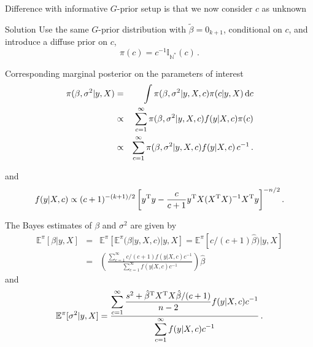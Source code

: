 \begin{slide}

Difference with informative $G$-prior setup is that we now
consider $c$ as unknown 

\pause\vs \begin{block}{Solution} 
Use the same $G$-prior distribution with $\tilde\beta=0_{k+1}$, 
conditional on $c$, and introduce a diffuse prior on $c$, 
$$
\pi(c) = c^{-1}\mathbb{I}_{\mathbb{N}^*}(c) \,.
$$
\end{block}

\end{slide}\begin{slide}

Corresponding marginal posterior on the parameters of interest 
\small
\begin{eqnarray*}
\pi(\beta,\sigma^2|y,X) &=& \int \pi(\beta,\sigma^2|y,X,c)\pi(c|y,X)\,\hbox{d}c \\
&\propto& \sum_{c=1}^\infty \pi(\beta,\sigma^2|y,X,c)f(y|X,c)\pi(c) \\
&\propto& \sum_{c=1}^\infty \pi(\beta,\sigma^2|y,X,c)f(y|X,c)\,c^{-1}\,.
\end{eqnarray*}
\normalsize

\pause
and %
$$
f(y|X,c) \propto (c+1)^{-(k+1)/2} \left[y^{\mathrm{T}} y-\frac{c}{c+1}y^{\mathrm{T}} X(X^{\mathrm{T}} X)^{-1}X^{\mathrm{T}} y\right]^{-n/2}.
$$

\end{slide}\begin{slide}

The Bayes estimates of $\beta$ and $\sigma^2$ are given by
\small
\begin{eqnarray*}
\mathbb{E}^\pi[\beta|y,X]&=&\mathbb{E}^\pi[\mathbb{E}^\pi(\beta|y,X,c)|y,X]=\mathbb{E}^\pi[c/(c+1)\hat\beta)|y,X]\nonumber\\
&=&\left(\frac{\displaystyle \sum_{c=1}^\infty c/(c+1)f(y|X,c)c^{-1}}{\displaystyle 
\sum_{c=1}^\infty f(y|X,c)c^{-1}}\right) \hat\beta
\end{eqnarray*}
\normalsize
and
\small
$$
\mathbb{E}^\pi[\sigma^2|y,X]=
\frac{\displaystyle \sum_{c=1}^\infty \frac{s^2+\hat\beta^{\mathrm{T}} X^{\mathrm{T}} X\hat\beta/(c+1)}{n-2}f(y|X,c)c^{-1}}
{\displaystyle \sum_{c=1}^\infty f(y|X,c)c^{-1}}\,.
$$
\normalsize

\end{slide}\begin{slide}


\end{slide}

